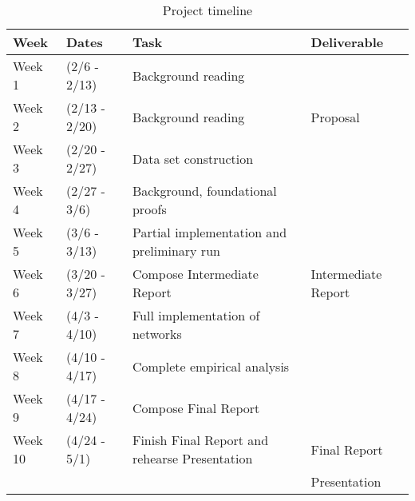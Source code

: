 \begin{table*}[t]
  \caption{Project timeline}
  \label{tab:freq}
  \begin{tabular}{llll}
    \toprule
    Week & Dates & Task & Deliverable\\
    \midrule
    Week 1 & (2/6   - 2/13) & Background reading & \\
    Week 2 & (2/13  - 2/20) & Background reading & Proposal\\
    Week 3 & (2/20  - 2/27) & Data set construction & \\
    Week 4 & (2/27  - 3/6)  & Background, foundational proofs & \\
    Week 5 & (3/6   - 3/13) & Partial implementation and preliminary run & \\
    Week 6 & (3/20  - 3/27) & Compose Intermediate Report & Intermediate Report\\
    Week 7 & (4/3   - 4/10) & Full implementation of networks & \\
    Week 8 & (4/10  - 4/17) & Complete empirical analysis & \\
    Week 9 & (4/17  - 4/24) & Compose Final Report & \\
    Week 10 & (4/24 - 5/1) & Finish Final Report and rehearse Presentation & Final Report \\
    & & & Presentation\\
  \bottomrule
\end{tabular}
\end{table*}
